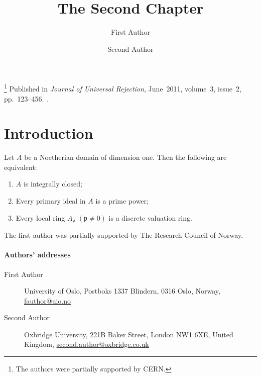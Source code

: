 \documentclass{standalone}
\begin{document}
\author
{
    First Author
    \and
    Second Author
}
\title{The Second Chapter}
\thanks{The authors were partially supported by CERN.}
\metadata
{
    Published in \emph{Journal of Universal Rejection},
    June~2011,
    volume~3,
    issue~2,
    pp.~123--456.
    .
}
\maketitle
\label{pap:second}

\begin{abstract}
    \kant[7]     %
\end{abstract}

\startcontents[chapters]

\section{Introduction}

\kant[8-11]      %

\begin{theorem}[{\cite[95]{AM69}}]
    \label{thm:dedekind}
    Let \( A \) be a Noetherian domain of dimension one. Then the following are equivalent:
    \begin{enumerate}
        \item
        \( A \) is integrally closed;

        \item
        Every primary ideal in \( A \) is a prime power;

        \item
        Every local ring \( A_\mathfrak{p} \) \( (\mathfrak{p} \neq 0) \) is a discrete valuation ring.
    \end{enumerate}
\end{theorem}

\begin{acknowledgements}
    The first author was partially supported by The Research Council of Norway.
\end{acknowledgements}

\printbibliography[heading = subbibliography]
\stopcontents[chapters]

\paragraph{Authors' addresses}
\begin{description}
    \item[First Author]
    University of Oslo,
    Postboks 1337 Blindern, 0316 Oslo, Norway,
    \href{mailto:fauthor@uio.no}{fauthor@uio.no}

    \item[Second Author]
    Oxbridge University,
    221B Baker Street, London NW1 6XE, United Kingdom,
    \href{mailto:second.author@oxbridge.co.uk}{second.author@oxbridge.co.uk}
\end{description}
\end{document}
